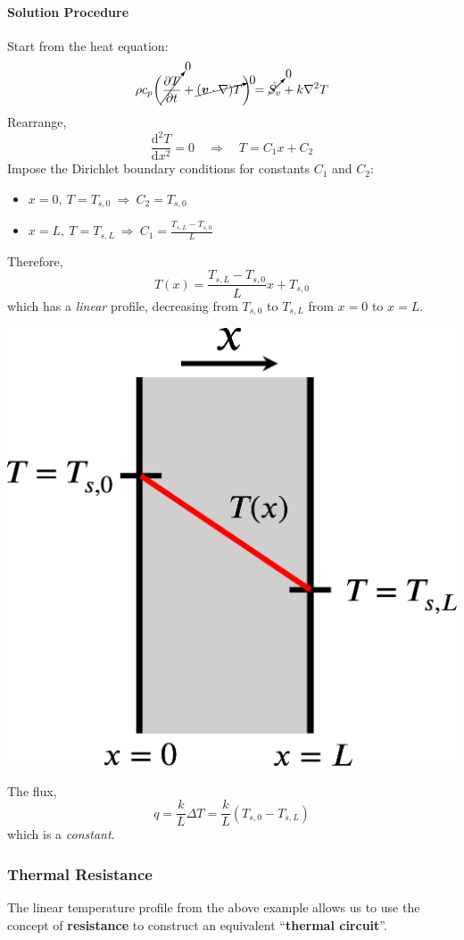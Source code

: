 \documentclass[12pt, a4paper]{article}
\begin{document}
\begin{tcolorbox}[breakable, title = \textbf{Example: 1-D Steady-State Conduction}]
\paragraph{Solution Procedure} Start from the heat equation:
\[ 
    \rho c_{p}\bigg( \cancelto{0}{\frac{\partial T}{\partial t}} +\cancelto{0}{(\bm{v} \cdot \nabla) T} \bigg) = \cancelto{0}{\dot{S_{v}}} +k \nabla^{2} T 
\]
Rearrange,
\[ 
    \frac{\mathrm{d}^{2} T}{\mathrm{d} x^{2}}=0 \quad \Rightarrow \quad T = C_{1}x + C_{2} 
\]
Impose the Dirichlet boundary conditions for constants $C_1$ and $C_2$: 
\begin{itemize}
    \item $\displaystyle x=0, \ T = T_{s,0} \ \Rightarrow \ C_{2} = T_{s,0}$ 
    \item $\displaystyle x=L, \ T = T_{s, L} \ \Rightarrow \ C_{1}=\frac{T_{s,L}-T_{s,0}}{L}$
\end{itemize}
Therefore,
\[ 
    T(x) = \frac{T_{s,L}-T_{s,0}}{L} x + T_{s,0}
\]
which has a \textit{linear} profile, decreasing from $T_{s,0}$ to $T_{s, L}$ from $x=0$ to $x=L$. 
\begin{center}
    \includegraphics[width=.4\textwidth]{img/oneD_conduction_wall_solution.eps}
\end{center}

The flux, 
\[ 
    q = \frac{k}{L} \Delta T = \frac{k}{L} (T_{s,0}-T_{s,L}) 
\]
which is a \textit{constant}.
\end{tcolorbox}

\subsubsection{Thermal Resistance}
The linear temperature profile from the above example allows us to use the concept of \textbf{resistance} to construct an equivalent ``\textbf{thermal circuit}''.
\end{document}
